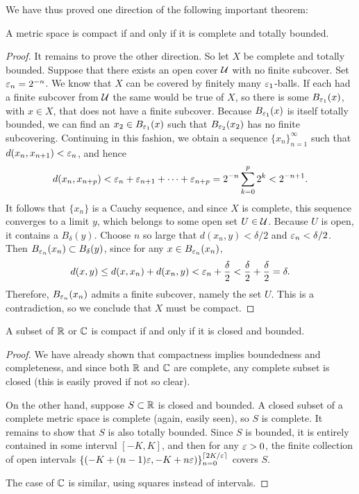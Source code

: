 We have thus proved one direction of the following important theorem:
\begin{theorem}
	A metric space is compact if and only if it is complete and totally bounded.
\end{theorem}
\begin{proof}
	It remains to prove the other direction. So let $X$ be complete and totally bounded. Suppose that there exists an open cover $\mathcal{U}$ with no finite subcover. Set $\varepsilon_n=2^{-n}$. We know that $X$ can be covered by finitely many $\varepsilon_1$-balls. If each had a finite subcover from $\mathcal{U}$ the same would be true of $X$, so there is some $B_{\varepsilon_1}(x)$, with $x \in X$, that does not have a finite subcover. Because $B_{\varepsilon_1}(x)$ is itself totally bounded, we can find an $x_2 \in B_{\varepsilon_1}(x)$ such that $B_{\varepsilon_2}(x_2)$ has no finite subcovering. Continuing in this fashion, we obtain a sequence $\{x_n\}_{n=1}^{\infty}$ such that $d(x_n,x_{n+1})<\varepsilon_n$, and hence $$d(x_n,x_{n+p})<\varepsilon_n+\varepsilon_{n+1}+\cdots+\varepsilon_{n+p}=2^{-n}\sum_{k=0}^{p}2^k<2^{-n+1}.$$ It follows that $\{x_n\}$ is a Cauchy sequence, and since $X$ is complete, this sequence converges to a limit $y$, which belongs to some open set $U \in \mathcal{U}$. Because $U$ is open, it contains a $B_{\delta}(y)$. Choose $n$ so large that $d(x_n,y)<\delta/2$ and $\varepsilon_n<\delta/2$. Then $B_{\varepsilon_n}(x_n) \subset B_{\delta}(y)$, since for any $x \in B_{\varepsilon_n}(x_n)$, $$d(x,y) \le d(x,x_n)+d(x_n,y)<\varepsilon_n+\dfrac{\delta}{2}<\dfrac{\delta}{2}+\dfrac{\delta}{2}=\delta.$$ Therefore, $B_{\varepsilon_n}(x_n)$ admits a finite subcover, namely the set $U$. This is a contradiction, so we conclude that $X$ must be compact.
\end{proof}

\begin{corollary}
	A subset of $\mathbb R$ or $\mathbb C$ is compact if and only if it is closed and bounded.
\end{corollary}
\begin{proof}
	We have already shown that compactness implies boundedness and completeness, and since both $\mathbb R$ and $\mathbb C$ are complete, any complete subset is closed (this is easily proved if not so clear). 
	
	On the other hand, suppose $S \subset \mathbb R$ is closed and bounded. A closed subset of a complete metric space is complete (again, easily seen), so $S$ is complete. It remains to show that $S$ is also totally bounded. Since $S$ is bounded, it is entirely contained in some interval $[-K,K]$, and then for any $\varepsilon>0$, the finite collection of open intervals $\{\left(-K+(n-1)\varepsilon,-K+n\varepsilon\right)\}_{n=0}^{\left\lceil 2K/\varepsilon \right\rceil}$ covers $S$.
	
	The case of $\mathbb C$ is similar, using squares instead of intervals.
\end{proof}

